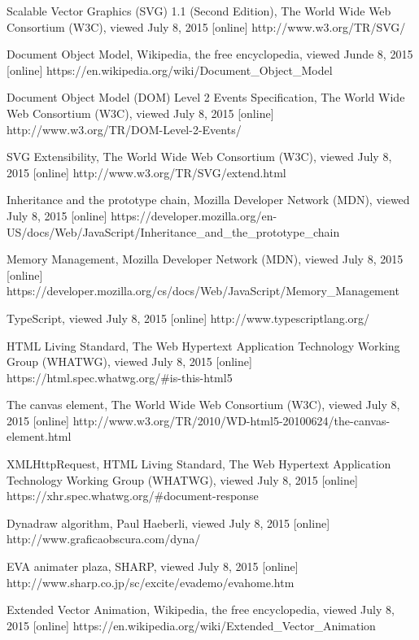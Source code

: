 \begin{thebibliography}{99}
Scalable Vector Graphics (SVG) 1.1 (Second Edition), The World Wide Web Consortium (W3C), viewed July 8, 2015 [online]
http://www.w3.org/TR/SVG/

Document Object Model, Wikipedia, the free encyclopedia, viewed Junde 8, 2015 [online]
https://en.wikipedia.org/wiki/Document\_Object\_Model

Document Object Model (DOM) Level 2 Events Specification, The World Wide Web Consortium (W3C), viewed July 8, 2015 [online]
http://www.w3.org/TR/DOM-Level-2-Events/


SVG Extensibility, The World Wide Web Consortium (W3C), viewed July 8, 2015 [online]
http://www.w3.org/TR/SVG/extend.html



Inheritance and the prototype chain, Mozilla Developer Network (MDN), viewed July 8, 2015 [online]
https://developer.mozilla.org/en-US/docs/Web/JavaScript/Inheritance\_and\_the\_prototype\_chain

Memory Management, Mozilla Developer Network (MDN), viewed July 8, 2015 [online]
https://developer.mozilla.org/cs/docs/Web/JavaScript/Memory\_Management

TypeScript, viewed July 8, 2015 [online] 
http://www.typescriptlang.org/

HTML Living Standard, The Web Hypertext Application Technology Working Group (WHATWG), viewed July 8, 2015 [online]
https://html.spec.whatwg.org/\#is-this-html5

The canvas element, The World Wide Web Consortium (W3C), viewed July 8, 2015 [online]
http://www.w3.org/TR/2010/WD-html5-20100624/the-canvas-element.html

XMLHttpRequest, HTML Living Standard, The Web Hypertext Application Technology Working Group (WHATWG), viewed July 8, 2015 [online]
https://xhr.spec.whatwg.org/\#document-response


Dynadraw algorithm, Paul Haeberli, viewed July 8, 2015 [online]
http://www.graficaobscura.com/dyna/


EVA animater plaza, SHARP, viewed July 8, 2015 [online]
http://www.sharp.co.jp/sc/excite/evademo/evahome.htm

Extended Vector Animation, Wikipedia, the free encyclopedia, viewed July 8, 2015 [online]
https://en.wikipedia.org/wiki/Extended\_Vector\_Animation


\end{thebibliography}
